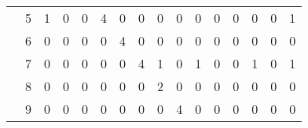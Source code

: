 \documentclass[12pt]{article}
\begin{document}
\begin{enumerate}
\begin{table}[H]
\begin{tabular}{@{}llllllllllllllll@{}}
\cellcolor[HTML]{34FF34}                                   & \cellcolor[HTML]{34FF34}5  & 1                         & 0                         & 0                         & 4                         & 0                         & 0                         & 0                         & 0                         & 0                          & 0                          & 0                          & 0                          & 0                          & 1                          \\
\cellcolor[HTML]{34FF34}                                   & \cellcolor[HTML]{34FF34}6  & 0                         & 0                         & 0                         & 0                         & 4                         & 0                         & 0                         & 0                         & 0                          & 0                          & 0                          & 0                          & 0                          & 0                          \\
\cellcolor[HTML]{34FF34}                                   & \cellcolor[HTML]{34FF34}7  & 0                         & 0                         & 0                         & 0                         & 0                         & 4                         & 1                         & 0                         & 1                          & 0                          & 0                          & 1                          & 0                          & 1                          \\
\cellcolor[HTML]{34FF34}                                   & \cellcolor[HTML]{34FF34}8  & 0                         & 0                         & 0                         & 0                         & 0                         & 0                         & 2                         & 0                         & 0                          & 0                          & 0                          & 0                          & 0                          & 0                          \\
\cellcolor[HTML]{34FF34}                                   & \cellcolor[HTML]{34FF34}9  & 0                         & 0                         & 0                         & 0                         & 0                         & 0                         & 0                         & 4                         & 0                          & 0                          & 0                          & 0                          & 0                          & 0                          \\

\end{tabular}
\end{table}
\end{enumerate}
\end{document}
